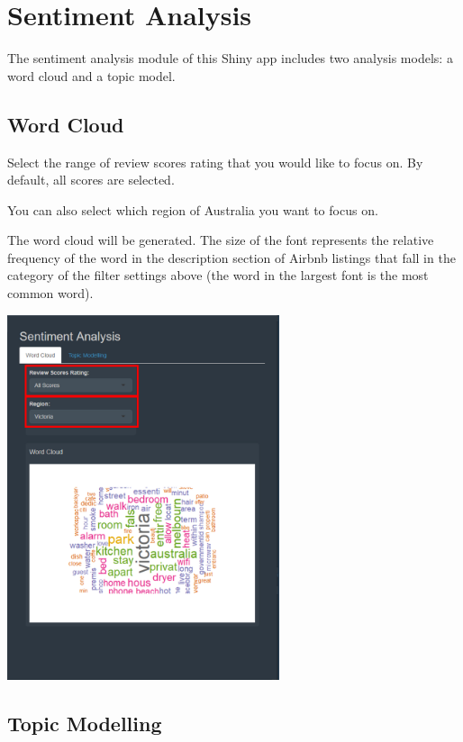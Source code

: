 \documentclass[
]{article}
\begin{document}
\hypertarget{sentiment-analysis}{%
\section{Sentiment Analysis}\label{sentiment-analysis}}

The sentiment analysis module of this Shiny app includes two analysis
models: a word cloud and a topic model.

\hypertarget{word-cloud}{%
\subsection{Word Cloud}\label{word-cloud}}

Select the range of review scores rating that you would like to focus
on. By default, all scores are selected.

You can also select which region of Australia you want to focus on.

The word cloud will be generated. The size of the font represents the
relative frequency of the word in the description section of Airbnb
listings that fall in the category of the filter settings above (the
word in the largest font is the most common word).

\includegraphics[width=0.6\textwidth,height=\textheight]{images/wordcloud1.png}

\hypertarget{topic-modelling}{%
\subsection{Topic Modelling}\label{topic-modelling}}
\end{document}
